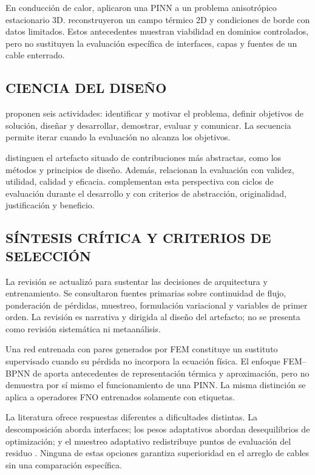 En conducción de calor, \textcite[1,3,17]{xing2023} aplicaron una PINN a un problema anisotrópico estacionario 3D. \textcite[1,3,16]{pan2025} reconstruyeron un campo térmico 2D y condiciones de borde con datos limitados. Estos antecedentes muestran viabilidad en dominios controlados, pero no sustituyen la evaluación específica de interfaces, capas y fuentes de un cable enterrado.

\subsection{CIENCIA DEL DISEÑO}

\textcite[54--56]{peffers2007} proponen seis actividades: identificar y motivar el problema, definir objetivos de solución, diseñar y desarrollar, demostrar, evaluar y comunicar. La secuencia permite iterar cuando la evaluación no alcanza los objetivos.

\textcite[342--350]{gregor2013} distinguen el artefacto situado de contribuciones más abstractas, como los métodos y principios de diseño. Además, relacionan la evaluación con validez, utilidad, calidad y eficacia. \textcite[198--203]{delport2024} complementan esta perspectiva con ciclos de evaluación durante el desarrollo y con criterios de abstracción, originalidad, justificación y beneficio.

\subsection{SÍNTESIS CRÍTICA Y CRITERIOS DE SELECCIÓN}

La revisión se actualizó para sustentar las decisiones de arquitectura y entrenamiento. Se consultaron fuentes primarias sobre continuidad de flujo, ponderación de pérdidas, muestreo, formulación variacional y variables de primer orden. La revisión es narrativa y dirigida al diseño del artefacto; no se presenta como revisión sistemática ni metaanálisis.

Una red entrenada con pares generados por FEM constituye un sustituto supervisado cuando su pérdida no incorpora la ecuación física. El enfoque FEM--BPNN de \textcite{aldulaimi2024} aporta antecedentes de representación térmica y aproximación, pero no demuestra por sí mismo el funcionamiento de una PINN. La misma distinción se aplica a operadores FNO entrenados solamente con etiquetas.

La literatura ofrece respuestas diferentes a dificultades distintas. La descomposición aborda interfaces; los pesos adaptativos abordan desequilibrios de optimización; y el muestreo adaptativo redistribuye puntos de evaluación del residuo \parencites{jagtap2020cpinn}{wang2020gradients}{wu2022sampling}. Ninguna de estas opciones garantiza superioridad en el arreglo de cables sin una comparación específica.

